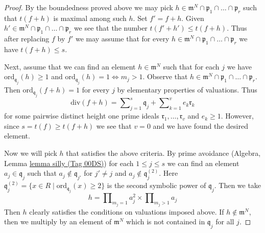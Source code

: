 \documentclass{amsart}
\theoremstyle{plain}
\theoremstyle{definition}
\theoremstyle{remark}
\numberwithin{equation}{subsection}
\begin{document}
\begin{proof}
\medskip\noindent
By the boundedness proved above we may pick
$h \in \mathfrak m^N \cap \mathfrak p_1 \cap \ldots \cap \mathfrak p_r$
such that $t(f + h)$ is maximal among such $h$. Set $f' = f + h$.
Given $h' \in \mathfrak m^N \cap \mathfrak p_1 \cap \ldots \cap \mathfrak p_r$
we see that the number $t(f' + h') \leq t(f + h)$.
Thus after replacing $f$ by $f'$ we may assume that for every
$h \in \mathfrak m^N \cap \mathfrak p_1 \cap \ldots \cap \mathfrak p_r$
we have $t(f + h) \leq s$.

\medskip\noindent
Next, assume that we can find an element $h \in \mathfrak m^N$ such that
for each $j$ we have $\text{ord}_{\mathfrak q_j}(h) \geq 1$ and
$\text{ord}_{\mathfrak q_j}(h) = 1 \Leftrightarrow m_j > 1$.
Observe that
$h \in \mathfrak m^N \cap \mathfrak p_1 \cap \ldots \cap \mathfrak p_r$.
Then $\text{ord}_{\mathfrak q_j}(f + h) = 1$
for every $j$ by elementary properties of valuations.
Thus
$$
\text{div}(f + h) = \sum\nolimits_{j = 1}^s \mathfrak q_j +
\sum\nolimits_{k = 1}^v e_k \mathfrak r_k
$$
for some pairwise distinct height one prime ideals
$\mathfrak r_1, \ldots, \mathfrak r_v$ and $e_k \geq 1$.
However, since $s = t(f) \geq t(f + h)$ we see that $v = 0$
and we have found the desired element.

\medskip\noindent
Now we will pick $h$ that satisfies the above criteria.
By prime avoidance (Algebra, Lemma \href{https://stacks.math.columbia.edu/tag/00DS}{lemma silly (Tag 00DS)})
for each $1 \leq j \leq s$ we can find an element $a_j \in \mathfrak q_j$
such that $a_j \not \in \mathfrak q_{j'}$ for $j' \not = j$
and $a_j \not \in \mathfrak q_j^{(2)}$. Here
$\mathfrak q_j^{(2)} = \{x \in R \mid \text{ord}_{\mathfrak q_j}(x) \geq 2\}$
is the second symbolic power of $\mathfrak q_j$.
Then we take
$$
h = \prod\nolimits_{m_j = 1} a_j^2 \times
\prod\nolimits_{m_j > 1} a_j
$$
Then $h$ clearly satisfies the conditions on valuations imposed above.
If $h \not \in \mathfrak m^N$, then we multiply by an element of
$\mathfrak m^N$ which is not contained in $\mathfrak q_j$ for all $j$.
\end{proof}
\end{document}
